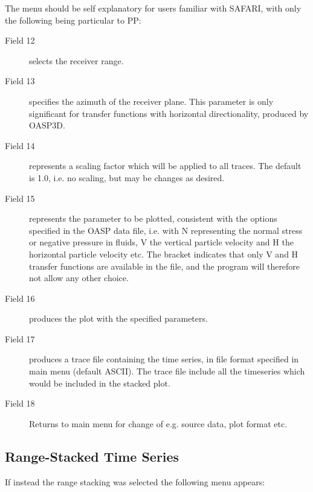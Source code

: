     The  menu should be self explanatory for users familiar  with 
SAFARI, with only the following being particular to PP: 
\begin{description}
\item[Field 12]  selects the receiver range.
\item[Field 13] specifies the azimuth of the receiver plane. This parameter
is only significant for transfer functions with horizontal
directionality, produced by OASP3D.
\item[Field 14] represents a scaling factor which will be applied to 
          all  traces. The default is 1.0, i.e. no  scaling,  but 
          may be changes as desired.
\item[Field 15]  represents  the  parameter to be  plotted, consistent
with the options specified in the OASP data file, i.e.  with  N 
          representing the normal stress or negative pressure  in 
          fluids,  V  the vertical particle velocity  and  H  the 
          horizontal  particle  velocity etc. The  bracket  indicates 
          that   only  V and H  transfer   functions   are 
          available  in the file, and the program will  therefore 
          not allow any other choice.
\item[Field 16] produces the plot with the specified parameters.
\item[Field 17] produces  a  trace file containing  the  time 
          series, in file format specified in main menu (default
          ASCII). The trace file include all the timeseries which
          would be included in the stacked plot.
\item[Field 18] Returns to main menu for change of e.g. source data, 
          plot format etc. 
\end{description}

\newpage
\subsection{Range-Stacked Time Series}

     If instead the range stacking was selected the following menu 
appears:


